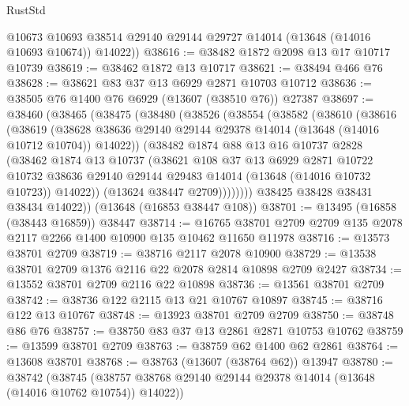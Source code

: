 \begin{lexlean}{RustStd}
\begin{coremodule}
        @10673
        @10693
        @38514
        @29140
        @29144
        @29727
        @14014
        (@13648 (@14016 @10693 @10674))
        @14022))
@38616 := @38482 @1872 @2098 @13 @17 @10717 @10739
@38619 := @38462 @1872 @13 @10717
@38621 := @38494 @466 @76
@38628 := @38621 @83 @37 @13 @6929 @2871 @10703 @10712
@38636 := @38505 @76 @1400 @76 @6929 (@13607 (@38510 @76)) @27387
@38697 := @38460
    (@38465
      (@38475
        (@38480
          (@38526
            (@38554
              (@38582
                (@38610
                  (@38616
                    (@38619
                      (@38628
                        @38636
                        @29140
                        @29144
                        @29378
                        @14014
                        (@13648 (@14016 @10712 @10704))
                        @14022))
                    (@38482
                      @1874
                      @88
                      @13
                      @16
                      @10737
                      @2828
                      (@38462
                        @1874
                        @13
                        @10737
                        (@38621
                          @108
                          @37
                          @13
                          @6929
                          @2871
                          @10722
                          @10732
                          @38636
                          @29140
                          @29144
                          @29483
                          @14014
                          (@13648 (@14016 @10732 @10723))
                          @14022))
                      (@13624 @38447 @2709))))))))
        @38425
        @38428
        @38431
        @38434
        @14022))
    (@13648 (@16853 @38447 @108))
@38701 := @13495 (@16858 (@38443 @16859)) @38447
@38714 := @16765 @38701 @2709 @2709 @135 @2078 @2117 @2266 @1400 @10900 @135 @10462 @11650 @11978
@38716 := @13573 @38701 @2709
@38719 := @38716 @2117 @2078 @10900
@38729 := @13538 @38701 @2709 @1376 @2116 @22 @2078 @2814 @10898 @2709 @2427
@38734 := @13552 @38701 @2709 @2116 @22 @10898
@38736 := @13561 @38701 @2709
@38742 := @38736 @122 @2115 @13 @21 @10767 @10897
@38745 := @38716 @122 @13 @10767
@38748 := @13923 @38701 @2709 @2709
@38750 := @38748 @86 @76
@38757 := @38750 @83 @37 @13 @2861 @2871 @10753 @10762
@38759 := @13599 @38701 @2709
@38763 := @38759 @62 @1400 @62 @2861
@38764 := @13608 @38701
@38768 := @38763 (@13607 (@38764 @62)) @13947
@38780 := @38742
    (@38745 (@38757 @38768 @29140 @29144 @29378 @14014 (@13648 (@14016 @10762 @10754)) @14022))

\end{coremodule}
\end{lexlean}
